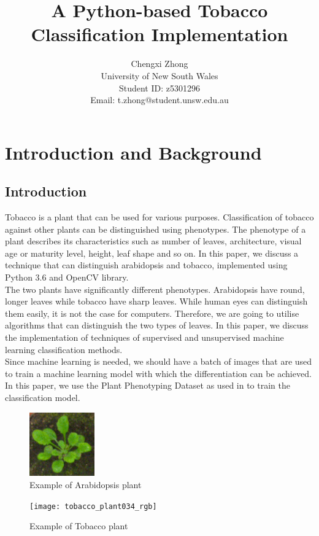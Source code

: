 \documentclass[9pt,technote]{IEEEtran}
\title{A Python-based Tobacco Classification Implementation}
\author{Chengxi Zhong\\ 
University of New South Wales\\ 
Student ID: z5301296\\
Email: t.zhong@student.unsw.edu.au
}
\begin{document}
\maketitle
\section{Introduction and Background}
\subsection{Introduction}
Tobacco is a plant that can be used for various purposes. Classification of tobacco against other plants can be distinguished using phenotypes. The phenotype of a plant describes its characteristics such as number of leaves, architecture, visual age or maturity level, height, leaf shape and so on.\cite{Phenotyp28:online} In this paper, we discuss a technique that can distinguish arabidopsis and tobacco, implemented using Python 3.6 and OpenCV\cite{OpenCV87:online} library.\\

The two plants have significantly different phenotypes. Arabidopsis have round, longer leaves while tobacco have sharp leaves. While human eyes can distinguish them easily, it is not the case for computers. Therefore, we are going to utilise algorithms that can distinguish the two types of leaves. In this paper, we discuss the implementation of techniques of supervised and unsupervised machine learning classification methods.\\

Since machine learning is needed, we should have a batch of images that are used to train a machine learning model with which the differentiation can be achieved. In this paper, we use the Plant Phenotyping Dataset as used in \cite{minervini2016finely} to train the classification model.
\begin{figure}[h!]
  \centering
  \includegraphics[width=0.25\textwidth]{ara2012_plant008_rgb}
  \caption{Example of Arabidopsis plant}
\end{figure}
\begin{figure}[h!]
  \centering
  \texttt{[image: tobacco\_plant034\_rgb]}
  \caption{Example of Tobacco plant}
\end{figure}
\end{document}
